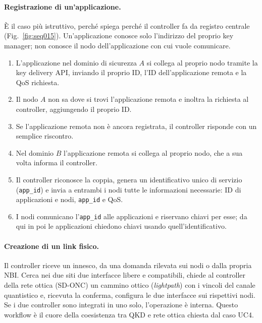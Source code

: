 \paragraph{Registrazione di un'applicazione.}
È il caso più istruttivo, perché spiega perché il controller fa da registro
centrale (Fig.~\ref{fig:seq015}). Un'applicazione conosce solo l'indirizzo
del proprio key manager; non conosce il nodo dell'applicazione con cui
vuole comunicare.
\begin{enumerate}
  \item L'applicazione nel dominio di sicurezza $A$ si collega al proprio
        nodo tramite la key delivery API, inviando il proprio ID, l'ID
        dell'applicazione remota e la QoS richiesta.
  \item Il nodo $A$ non sa dove si trovi l'applicazione remota e inoltra la
        richiesta al controller, aggiungendo il proprio ID.
  \item Se l'applicazione remota non è ancora registrata, il controller
        risponde con un semplice riscontro.
  \item Nel dominio $B$ l'applicazione remota si collega al proprio nodo, che
        a sua volta informa il controller.
  \item Il controller riconosce la coppia, genera un identificativo unico
        di servizio (\texttt{app\_id}) e invia a entrambi i nodi tutte le
        informazioni necessarie: ID di applicazioni e nodi, \texttt{app\_id}
        e QoS.
  \item I nodi comunicano l'\texttt{app\_id} alle applicazioni e riservano
        chiavi per esse; da qui in poi le applicazioni chiedono chiavi
        usando quell'identificativo.
\end{enumerate}



\paragraph{Creazione di un link fisico.}
Il controller riceve un innesco, da una domanda rilevata sui nodi o dalla
propria NBI. Cerca nei due siti due interfacce libere e compatibili,
chiede al controller della rete ottica (SD-ONC) un cammino ottico
(\emph{lightpath}) con i vincoli del canale quantistico e, ricevuta la
conferma, configura le due interfacce sui rispettivi nodi. Se i due
controller sono integrati in uno solo, l'operazione è interna. Questo
workflow è il cuore della coesistenza tra QKD e rete ottica chiesta dal
caso UC4.


